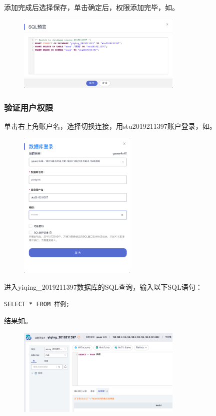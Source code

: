 \documentclass[lang=cn,11pt,a4paper,cite=authornum]{paper}
\begin{document}
添加完成后选择保存，单击确定后，权限添加完毕，如。
\begin{figure}[!htb]
    \centering
    \includegraphics[width=0.7\textwidth]{./images/res10.png}
    \caption{\label{fig:res10}}
\end{figure}

\subsubsection{验证用户权限}

单击右上角账户名，选择切换连接，用stu2019211397账户登录，如。
\begin{figure}[!htb]
    \centering
    \includegraphics[width=0.5\textwidth]{./images/res11.png}
    \caption{\label{fig:res11}}
\end{figure}

进入yiqing\_2019211397数据库的SQL查询，输入以下SQL语句：
\begin{code}
\begin{verbatim}
SELECT * FROM 样例;
\end{verbatim}
\end{code}

结果如。
\begin{figure}[!htb]
    \centering
    \includegraphics[width=0.7\textwidth]{./images/res12.png}
    \caption{\label{fig:res12}}
\end{figure}
\end{document}
